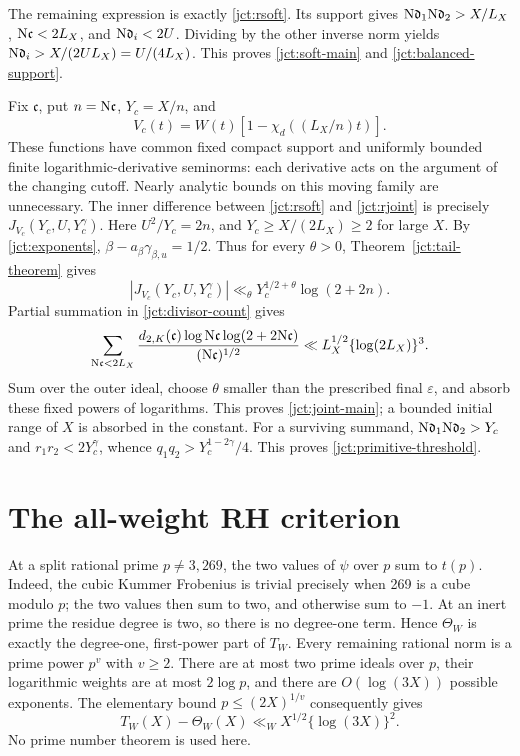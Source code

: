 The remaining expression is exactly \eqref{jct:rsoft}.
Its support gives
\(\mathrm N\mathfrak d_1\mathrm N\mathfrak d_2>X/L_X\),
\(\mathrm N\mathfrak c<2L_X\), and \(\mathrm N\mathfrak d_i<2U\).
Dividing by the other inverse norm yields
\(\mathrm N\mathfrak d_i>X/(2UL_X)=U/(4L_X)\).
This proves \eqref{jct:soft-main} and \eqref{jct:balanced-support}.

Fix \(\mathfrak c\), put \(n=\mathrm N\mathfrak c\),
\(Y_c=X/n\), and
\[
 V_c(t)=W(t)[1-\chi_d((L_X/n)t)].
\]
These functions have common fixed compact support and uniformly
bounded finite logarithmic-derivative seminorms: each derivative
acts on the argument of the changing cutoff.  Nearly analytic
bounds on this moving family are unnecessary.
The inner difference between \eqref{jct:rsoft} and
\eqref{jct:rjoint} is precisely
\(J_{V_c}(Y_c,U,Y_c^\gamma)\).
Here \(U^2/Y_c=2n\), and \(Y_c\ge X/(2L_X)\ge2\) for large
\(X\). By \eqref{jct:exponents},
\(\beta-a_\beta\gamma_{\beta,u}=1/2\).
Thus for every \(\theta>0\), Theorem~\ref{jct:tail-theorem} gives
\[
 |J_{V_c}(Y_c,U,Y_c^\gamma)|
 \ll_\theta Y_c^{1/2+\theta}\log(2+2n).
\]
Partial summation in \eqref{jct:divisor-count} gives
\[
 \sum_{\mathrm N\mathfrak c<2L_X}
 \frac{d_{2,K}(\mathfrak c)\log\mathrm N\mathfrak c
             \log(2+2\mathrm N\mathfrak c)}{(\mathrm N\mathfrak c)^{1/2}}
 \ll L_X^{1/2}\{\log(2L_X)\}^3.
\]
Sum over the outer ideal, choose \(\theta\) smaller than the
prescribed final \(\varepsilon\), and absorb these fixed powers
of logarithms.  This proves \eqref{jct:joint-main}; a bounded
initial range of \(X\) is absorbed in the constant.
For a surviving summand,
\(\mathrm N\mathfrak d_1\mathrm N\mathfrak d_2>Y_c\) and
\(r_1r_2<2Y_c^\gamma\), whence
\(q_1q_2>Y_c^{1-2\gamma}/4\).
This proves \eqref{jct:primitive-threshold}.

\section{The all-weight RH criterion}
At a split rational prime \(p\ne3,269\), the two values of
\(\psi\) over \(p\) sum to \(t(p)\).
Indeed, the cubic Kummer Frobenius is trivial precisely when
269 is a cube modulo \(p\); the two values then sum to two,
and otherwise sum to \(-1\).
At an inert prime the residue degree is two, so there is no
degree-one term.  Hence \(\Theta_W\) is exactly the
degree-one, first-power part of \(T_W\).
Every remaining rational norm is a prime power \(p^v\) with
\(v\ge2\).  There are at most two prime ideals over \(p\),
their logarithmic weights are at most \(2\log p\), and
there are \(O(\log(3X))\) possible exponents.  The elementary
bound \(p\le(2X)^{1/v}\) consequently gives
\begin{equation}
 T_W(X)-\Theta_W(X)
 \ll_W X^{1/2}\{\log(3X)\}^2.
 \label{jct:prime-powers}
\end{equation}
No prime number theorem is used here.

